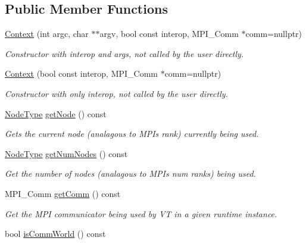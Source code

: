 \subsection*{Public Member Functions}
\begin{DoxyCompactItemize}
\item 
\hyperlink{structvt_1_1ctx_1_1_context_a860016b34ca68006a733314f970216b8}{Context} (int argc, char $\ast$$\ast$argv, bool const interop, M\+P\+I\+\_\+\+Comm $\ast$comm=nullptr)
\begin{DoxyCompactList}\small\item\em Constructor with interop and args, not called by the user directly. \end{DoxyCompactList}\item 
\hyperlink{structvt_1_1ctx_1_1_context_a9f5b0fcad61a79f18fdaf7d757b52b6a}{Context} (bool const interop, M\+P\+I\+\_\+\+Comm $\ast$comm=nullptr)
\begin{DoxyCompactList}\small\item\em Constructor with only interop, not called by the user directly. \end{DoxyCompactList}\item 
\hyperlink{namespacevt_a866da9d0efc19c0a1ce79e9e492f47e2}{Node\+Type} \hyperlink{structvt_1_1ctx_1_1_context_a0d52c263ce8516546a67443d9a86fa5f}{get\+Node} () const
\begin{DoxyCompactList}\small\item\em Gets the current node (analagous to M\+PI\textquotesingle{}s rank) currently being used. \end{DoxyCompactList}\item 
\hyperlink{namespacevt_a866da9d0efc19c0a1ce79e9e492f47e2}{Node\+Type} \hyperlink{structvt_1_1ctx_1_1_context_a7f41071aadf6d5fa9e1b6c703c5ff19d}{get\+Num\+Nodes} () const
\begin{DoxyCompactList}\small\item\em Get the number of nodes (analagous to M\+PI\textquotesingle{}s num ranks) being used. \end{DoxyCompactList}\item 
M\+P\+I\+\_\+\+Comm \hyperlink{structvt_1_1ctx_1_1_context_a2d4378c97824792991a3410449cf19db}{get\+Comm} () const
\begin{DoxyCompactList}\small\item\em Get the M\+PI communicator being used by VT in a given runtime instance. \end{DoxyCompactList}\item 
bool \hyperlink{structvt_1_1ctx_1_1_context_a78d9926c3f75b1296e81607fd303f8f1}{is\+Comm\+World} () const
$$
\end{DoxyCompactItemize}
